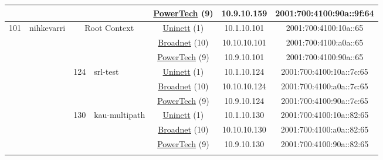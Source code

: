 \begin{small}
\begin{center}
\begin{longtable}{|c|c|c|c|c|c|c|c|}
  &  &  &  & \multicolumn{2}{|c|}{\tiny{\href{http://www.powertech.no}{PowerTech} (9)}} & \tiny{10.9.10.159} & \tiny{2001:700:4100:90a::9f:64} \\ \hline
 \multirow{24}{*}{\tiny{101}} & \multicolumn{1}{|l|}{\multirow{24}{*}{\tiny{nihkevarri}}} & \multicolumn{2}{|c|}{\multirow{3}{*}{\tiny{Root Context}}} & \multicolumn{2}{|c|}{\tiny{\href{https://www.uninett.no}{Uninett} (1)}} & \tiny{10.1.10.101} & \tiny{2001:700:4100:10a::65} \\* \cline{5-5}\cline{6-6}\cline{7-7}\cline{8-8}
  &  & \multicolumn{2}{|c|}{} & \multicolumn{2}{|c|}{\tiny{\href{https://www.broadnet.no}{Broadnet} (10)}} & \tiny{10.10.10.101} & \tiny{2001:700:4100:a0a::65} \\* \cline{5-5}\cline{6-6}\cline{7-7}\cline{8-8}
  &  & \multicolumn{2}{|c|}{} & \multicolumn{2}{|c|}{\tiny{\href{http://www.powertech.no}{PowerTech} (9)}} & \tiny{10.9.10.101} & \tiny{2001:700:4100:90a::65} \\* \cline{3-3}\cline{4-4}\cline{5-5}\cline{6-6}\cline{7-7}\cline{8-8}
  &  & \multirow{3}{*}{\tiny{124}} & \multicolumn{1}{|l|}{\multirow{3}{*}{\tiny{srl-test}}} & \multicolumn{2}{|c|}{\tiny{\href{https://www.uninett.no}{Uninett} (1)}} & \tiny{10.1.10.124} & \tiny{2001:700:4100:10a::7c:65} \\* \cline{5-5}\cline{6-6}\cline{7-7}\cline{8-8}
  &  &  &  & \multicolumn{2}{|c|}{\tiny{\href{https://www.broadnet.no}{Broadnet} (10)}} & \tiny{10.10.10.124} & \tiny{2001:700:4100:a0a::7c:65} \\* \cline{5-5}\cline{6-6}\cline{7-7}\cline{8-8}
  &  &  &  & \multicolumn{2}{|c|}{\tiny{\href{http://www.powertech.no}{PowerTech} (9)}} & \tiny{10.9.10.124} & \tiny{2001:700:4100:90a::7c:65} \\* \cline{3-3}\cline{4-4}\cline{5-5}\cline{6-6}\cline{7-7}\cline{8-8}
  &  & \multirow{3}{*}{\tiny{130}} & \multicolumn{1}{|l|}{\multirow{3}{*}{\tiny{kau-multipath}}} & \multicolumn{2}{|c|}{\tiny{\href{https://www.uninett.no}{Uninett} (1)}} & \tiny{10.1.10.130} & \tiny{2001:700:4100:10a::82:65} \\* \cline{5-5}\cline{6-6}\cline{7-7}\cline{8-8}
  &  &  &  & \multicolumn{2}{|c|}{\tiny{\href{https://www.broadnet.no}{Broadnet} (10)}} & \tiny{10.10.10.130} & \tiny{2001:700:4100:a0a::82:65} \\* \cline{5-5}\cline{6-6}\cline{7-7}\cline{8-8}
  &  &  &  & \multicolumn{2}{|c|}{\tiny{\href{http://www.powertech.no}{PowerTech} (9)}} & \tiny{10.9.10.130} & \tiny{2001:700:4100:90a::82:65} \\* \cline{3-3}\cline{4-4}\cline{5-5}\cline{6-6}\cline{7-7}\cline{8-8}

\end{longtable}
\end{center}
\end{small}
